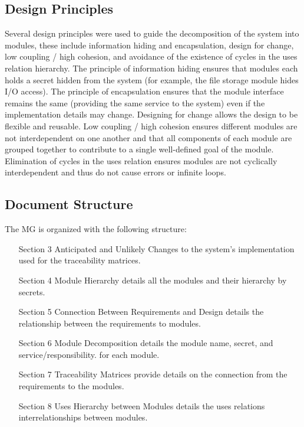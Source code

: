 \documentclass[12pt, titlepage]{article}
\begin{document}
\subsection{Design Principles} 

Several design principles were used to guide the decomposition of the system into modules, these include information hiding and encapsulation, design for change, low coupling / high cohesion, and avoidance of the existence of cycles in the uses relation hierarchy. The principle of information hiding ensures that modules each holds a secret hidden from the system (for example, the file storage module hides I/O access). The principle of encapsulation ensures that the module interface remains the same (providing the same service to the system) even if the implementation details may change. Designing for change allows the design to be flexible and reusable. Low coupling / high cohesion ensures different modules are not interdependent on one another and that all components of each module are grouped together to contribute to a single well-defined goal of the module. Elimination of cycles in the uses relation ensures modules are not cyclically interdependent and thus do not cause errors or infinite loops.

\subsection{Document Structure}

The MG is organized with the following structure:

\begin{itemize}
\item [Section 3]
Anticipated and Unlikely Changes to the system’s implementation used for the traceability matrices.
\item [Section 4]
Module Hierarchy details all the modules and their hierarchy by secrets.
\item [Section 5]
Connection Between Requirements and Design details the relationship between the requirements to modules.
\item [Section 6]
Module Decomposition details the module name, secret, and service/responsibility.
for each module.
\item [Section 7]
Traceability Matrices provide details on the connection from the requirements to the modules.
\item [Section 8]
Uses Hierarchy between Modules details the uses relations interrelationships between modules.
\end{itemize}
\end{document}
